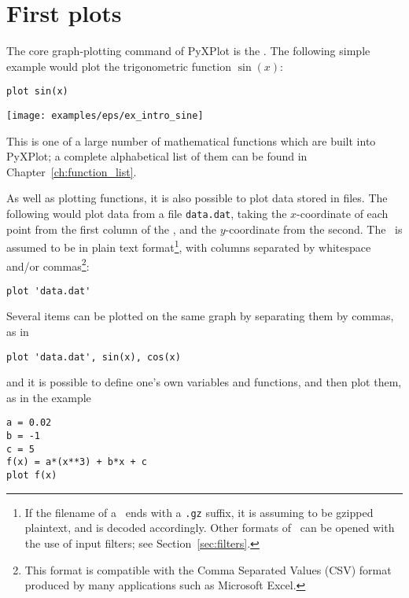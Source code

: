 \section{First plots}
\label{sec:first_plots}

The core graph-plotting command of PyXPlot is the . The following
simple example would plot the trigonometric function $\sin(x)$:

\begin{verbatim}
plot sin(x)
\end{verbatim}

\begin{center}
\texttt{[image: examples/eps/ex\_intro\_sine]}
\end{center}

\noindent This is one of a large number of mathematical functions which are
built into PyXPlot; a complete alphabetical list of them can be found in
Chapter~\ref{ch:function_list}.

As well as plotting functions, it is also possible to plot data stored in
files. The following would plot data from a file {\tt data.dat}, taking the
$x$-coordinate of each point from the first column of the \datafile, and the
$y$-coordinate from the second.  The \datafile\ is assumed to be in plain text
format\footnote{If the filename of a \datafile\ ends with a {\tt .gz} suffix,
it is assuming to be gzipped plaintext, and is decoded accordingly. Other
formats of \datafile\ can be opened with the use of input filters; see
Section~\ref{sec:filters}.}, with columns separated by whitespace and/or
commas\footnote{This format is compatible with the Comma Separated Values (CSV)
format produced by many applications such as Microsoft Excel.}:

\begin{verbatim}
plot 'data.dat'
\end{verbatim}

Several items can be plotted on the same graph by separating them by commas, as
in

\begin{verbatim}
plot 'data.dat', sin(x), cos(x)
\end{verbatim}

\noindent and it is possible to define one's own variables and functions,
and then plot them, as in the example

\begin{verbatim}
a = 0.02
b = -1
c = 5
f(x) = a*(x**3) + b*x + c
plot f(x)
\end{verbatim}

